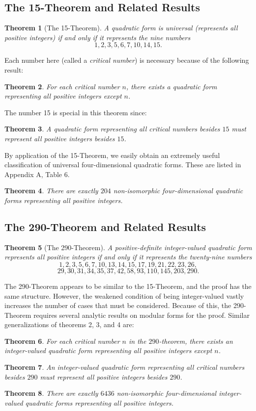 \documentclass[letterpaper, 12pt]{article}
\newtheorem{thm}{Theorem}
\begin{document}
\subsection{The 15-Theorem and Related Results}
\begin{thm}[The 15-Theorem]\label{15thm}
    A quadratic form is universal (represents all positive integers) if and only if it represents the nine numbers
    \[1, 2, 3, 5, 6, 7, 10, 14, 15.\]
\end{thm}
Each number here (called a \emph{critical number}) is necessary because of the following result:
\begin{thm}\label{critnumsneeded}
    For each critical number $n$, there exists a quadratic form representing all positive integers except $n$.
\end{thm}
The number 15 is special in this theorem since:
\begin{thm}\label{15thmgeneral}
    A quadratic form representing all critical numbers besides $15$ must represent all positive integers besides $15$.
\end{thm}
By application of the 15-Theorem, we easily obtain an extremely useful classification of universal four-dimensional quadratic forms. These are listed in Appendix A, Table 6.
\begin{thm}\label{universal 4d}
    There are exactly $204$ non-isomorphic four-dimensional quadratic forms representing all positive integers.
\end{thm}

\subsection{The 290-Theorem and Related Results}
\begin{thm}[The 290-Theorem]\label{290thm}
    A positive-definite \emph{integer-valued} quadratic form represents all positive integers if and only if it represents the twenty-nine numbers
    \[1, 2, 3, 5, 6, 7, 10, 13, 14, 15, 17, 19, 21, 22, 23, 26,\]
    \[29, 30, 31, 34, 35, 37, 42, 58, 93, 110, 145, 203, 290.\]
\end{thm}
The 290-Theorem appears to be similar to the 15-Theorem, and the proof has the same structure. However, the weakened condition of being integer-valued vastly increases the number of cases that must be considered. Because of this, the 290-Theorem requires several analytic results on modular forms for the proof.
Similar generalizations of theorems 2, 3, and 4 are:
\begin{thm}\label{290critnumsneeded}
    For each critical number $n$ in the $290$-theorem, there exists an integer-valued quadratic form representing all positive integers except $n$.
\end{thm}
\begin{thm}\label{290thmgeneral}
    An integer-valued quadratic form representing all critical numbers besides $290$ must represent all positive integers besides $290$.
\end{thm}
\begin{thm}\label{290 universal 4d}
    There are exactly $6436$  non-isomorphic four-dimensional integer-valued quadratic forms representing all positive integers.
\end{thm}
\end{document}
